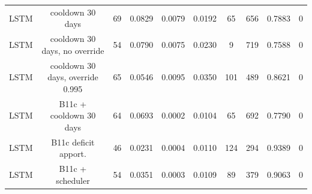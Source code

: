 \documentclass[10pt,onecolumn,letterpaper]{article}
\begin{document}
\begin{table}[!t]
{\begin{tabular}{lccccccccc}
LSTM & cooldown 30 days & 69 & 0.0829 & 0.0079 & 0.0192 & 65 & 656 & 0.7883 & 0 \\
LSTM & cooldown 30 days, no override & 54 & 0.0790 & 0.0075 & 0.0230 & 9 & 719 & 0.7588 & 0 \\
LSTM & cooldown 30 days, override 0.995 & 65 & 0.0546 & 0.0095 & 0.0350 & 101 & 489 & 0.8621 & 0 \\
LSTM & B11c + cooldown 30 days & 64 & 0.0693 & 0.0002 & 0.0104 & 65 & 692 & 0.7790 & 0 \\
LSTM & B11c deficit apport. & 46 & 0.0231 & 0.0004 & 0.0110 & 124 & 294 & 0.9389 & 0 \\
LSTM & B11c + scheduler & 54 & 0.0351 & 0.0003 & 0.0109 & 89 & 379 & 0.9063 & 0 \\
\bottomrule
\end{tabular}}
\end{table}
\end{document}
